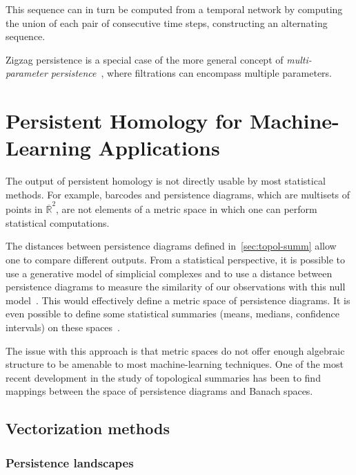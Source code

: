 \documentclass[a4paper,11pt,openany,extrafontsizes]{memoir}
\begin{document}
This sequence can in turn be computed from a temporal network by
computing the union of each pair of consecutive time steps,
constructing an alternating sequence.

Zigzag persistence is a special case of the more general concept of
\emph{multi-parameter
  persistence}~\cite{carlsson_theory_2009,dey_computing_2014}, where
filtrations can encompass multiple parameters.


\chapter{Persistent Homology for Machine-Learning Applications}%
\label{cha:pers-homol-mach}

The output of persistent homology is not directly usable by most
statistical methods. For example, barcodes and persistence diagrams,
which are multisets of points in $\overline{\mathbb{R}}^2$, are not
elements of a metric space in which one can perform statistical
computations.

The distances between persistence diagrams defined
in~\autoref{sec:topol-summ} allow one to compare different
outputs. From a statistical perspective, it is possible to use a
generative model of simplicial complexes and to use a distance between
persistence diagrams to measure the similarity of our observations
with this null model~\cite{adler_persistent_2010}. This would
effectively define a metric space of persistence diagrams. It is even
possible to define some statistical summaries (means, medians,
confidence intervals) on these
spaces~\cite{turner_frechet_2014,munch_probabilistic_2015}.


The issue with this approach is that metric spaces do not offer enough
algebraic structure to be amenable to most machine-learning
techniques. One of the most recent development in the study of
topological summaries has been to find mappings between the space of
persistence diagrams and Banach spaces.

\section{Vectorization methods}%
\label{sec:vect-meth}


\subsection{Persistence landscapes}
\end{document}
